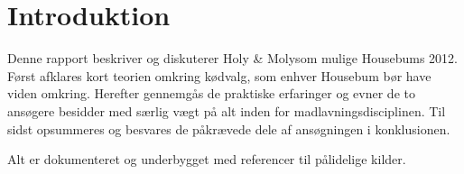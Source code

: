 \section{Introduktion}
Denne rapport beskriver og diskuterer Holy \& Moly\texttrademark som mulige Housebums 2012. Først afklares kort teorien omkring kødvalg, som enhver Housebum bør have viden omkring. Herefter gennemgås de praktiske erfaringer og evner de to ansøgere besidder med særlig vægt på alt inden for madlavningsdisciplinen. Til sidst opsummeres og besvares de påkrævede dele af ansøgningen i konklusionen. 

Alt er dokumenteret og underbygget med referencer til pålidelige kilder.